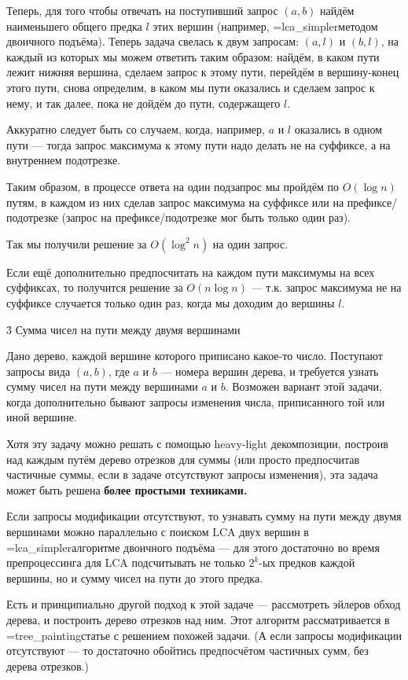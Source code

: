 Теперь, для того чтобы отвечать на поступивший запрос $(a,b)$ найдём наименьшего общего предка $l$ этих вершин (например, \algohref=lca_simpler{методом двоичного подъёма}). Теперь задача свелась к двум запросам: $(a,l)$ и $(b,l)$, на каждый из которых мы можем ответить таким образом: найдём, в каком пути лежит нижняя вершина, сделаем запрос к этому пути, перейдём в вершину-конец этого пути, снова определим, в каком мы пути оказались и сделаем запрос к нему, и так далее, пока не дойдём до пути, содержащего $l$.

Аккуратно следует быть со случаем, когда, например, $a$ и $l$ оказались в одном пути --- тогда запрос максимума к этому пути надо делать не на суффиксе, а на внутреннем подотрезке.

Таким образом, в процессе ответа на один подзапрос мы пройдём по $O (\log n)$ путям, в каждом из них сделав запрос максимума на суффиксе или на префиксе/подотрезке (запрос на префиксе/подотрезке мог быть только один раз).

Так мы получили решение за $O (\log^2 n)$ на один запрос.

Если ещё дополнительно предпосчитать на каждом пути максимумы на всех суффиксах, то получится решение за $O (n \log n)$ --- т.к. запрос максимума не на суффиксе случается только один раз, когда мы доходим до вершины $l$.


\h3{ Сумма чисел на пути между двумя вершинами }

Дано дерево, каждой вершине которого приписано какое-то число. Поступают запросы вида $(a,b)$, где $a$ и $b$ --- номера вершин дерева, и требуется узнать сумму чисел на пути между вершинами $a$ и $b$. Возможен вариант этой задачи, когда дополнительно бывают запросы изменения числа, приписанного той или иной вершине.

Хотя эту задачу можно решать с помощью heavy-light декомпозиции, построив над каждым путём дерево отрезков для суммы (или просто предпосчитав частичные суммы, если в задаче отсутствуют запросы изменения), эта задача может быть решена \bf{более простыми техниками}.

Если запросы модификации отсутствуют, то узнавать сумму на пути между двумя вершинами можно параллельно с поиском LCA двух вершин в \algohref=lca_simpler{алгоритме двоичного подъёма} --- для этого достаточно во время препроцессинга для LCA подсчитывать не только $2^k$-ых предков каждой вершины, но и сумму чисел на пути до этого предка.

Есть и принципиально другой подход к этой задаче --- рассмотреть эйлеров обход дерева, и построить дерево отрезков над ним. Этот алгоритм рассматривается в \algohref=tree_painting{статье с решением похожей задачи}. (А если запросы модификации отсутствуют --- то достаточно обойтись предпосчётом частичных сумм, без дерева отрезков.)

